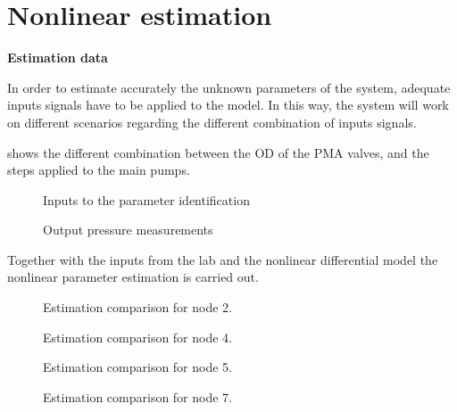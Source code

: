 \chapter{Nonlinear estimation}
\label{NonLinResults}

\textbf{Estimation data}

In order to estimate accurately the unknown parameters of the system, adequate inputs signals have to be applied to the model. In this way, the system 
will work on different scenarios regarding the different combination of inputs signals. 

 shows the different combination between the OD of the PMA valves, and the steps applied to the main pumps. 


\begin{figure}[H]
  \centering
  \begin{minipage}[b]{0.45\textwidth}
     
    \caption{Inputs to the parameter identification}
  \end{minipage}
  \hfill
  \begin{minipage}[b]{0.45\textwidth}
     
    \caption{Output pressure measurements}
  \end{minipage}
  \label{fig:nonlinearpumps}
\end{figure}



Together with the inputs from the lab and the nonlinear differential model the nonlinear parameter estimation is carried out. 

\begin{figure}[H]
  \centering
  \begin{minipage}[b]{0.45\textwidth}
    
    \caption{Estimation comparison for node 2.}
  \end{minipage}
  \hfill
  \begin{minipage}[b]{0.45\textwidth}
    
    \caption{Estimation comparison for node 4.}
  \end{minipage}
\end{figure}

\begin{figure}[H]
  \centering
  \begin{minipage}[b]{0.45\textwidth}
    
    \caption{Estimation comparison for node 5.}
  \end{minipage}
  \hfill
  \begin{minipage}[b]{0.45\textwidth}
    
    \caption{Estimation comparison for node 7.}
  \end{minipage}
\end{figure}

